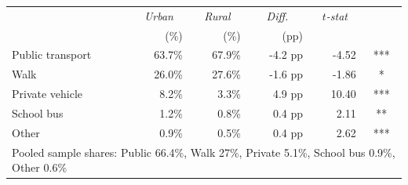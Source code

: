 \begin{tabular}{lrrrrc}
   \tabularnewline \midrule \midrule
 & \multicolumn{1}{c}{\textit{Urban}} & \multicolumn{1}{c}{\textit{Rural}} & \multicolumn{1}{c}{\textit{Diff.}} & \multicolumn{1}{c}{\textit{$t$-stat}} & \\
 & (\%) & (\%) & (pp) & & \\
\midrule
Public transport & 63.7\% & 67.9\% & -4.2 pp & -4.52 & *** \\
Walk & 26.0\% & 27.6\% & -1.6 pp & -1.86 & * \\
Private vehicle &  8.2\% &  3.3\% &  4.9 pp & 10.40 & *** \\
School bus &  1.2\% &  0.8\% &  0.4 pp & 2.11 & ** \\
Other &  0.9\% &  0.5\% &  0.4 pp & 2.62 & *** \\
\midrule
\multicolumn{6}{l}{\footnotesize Pooled sample shares: Public 66.4\%, Walk 27\%, Private 5.1\%, School bus 0.9\%, Other 0.6\%} \\
\bottomrule
\end{tabular}
